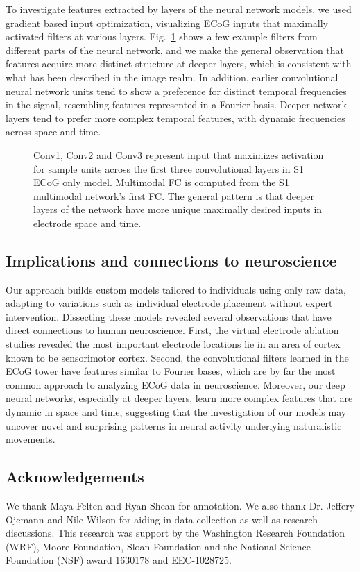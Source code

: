 \documentclass[letterpaper]{article} %
\begin{document}
To investigate features extracted by layers of the neural network models, we used gradient based input optimization, visualizing ECoG inputs that maximally activated filters at various layers. 
Fig.~\ref{fig:weights} shows a few example filters from different parts of the neural network, and we make the general observation that features acquire more distinct structure at deeper layers, which is consistent with what has been described in the image realm. 
In addition, earlier convolutional neural network units tend to show a preference for distinct temporal frequencies in the signal, resembling features represented in a Fourier basis. 
Deeper network layers tend to prefer more complex temporal features, with dynamic frequencies across space and time. 

\begin{figure}[t]
\centering
{}
\caption{Conv1, Conv2 and Conv3 represent input that maximizes activation for sample units across the first three convolutional layers in S1 ECoG only model. Multimodal FC is computed from the S1 multimodal network's first FC. The general pattern is that deeper layers of the network have more unique maximally desired inputs in electrode space and time.
}
\label{fig:weights}
\end{figure}

\subsection{Implications and connections to neuroscience} 

Our approach builds custom models tailored to individuals using only raw data, adapting to variations such as individual electrode placement without expert intervention.
Dissecting these models revealed several observations that have direct connections to human neuroscience.
First, the virtual electrode ablation studies revealed the most important electrode locations lie in an area of cortex known to be sensorimotor cortex.
Second, the convolutional filters learned in the ECoG tower have features similar to Fourier bases, which are by far the most common approach to analyzing ECoG data in neuroscience.
Moreover, our deep neural networks, especially at deeper layers, learn more complex features that are dynamic in space and time, suggesting that the investigation of our models may uncover novel and surprising patterns in neural activity underlying naturalistic movements. 

\subsection{Acknowledgements}

We thank Maya Felten and Ryan Shean for annotation. We also thank Dr. Jeffery Ojemann and Nile Wilson for aiding in data collection as well as research discussions. This research was support by the Washington Research Foundation (WRF), Moore Foundation, Sloan Foundation and the National Science Foundation (NSF) award 1630178 and EEC-1028725.





\small


\end{document}
